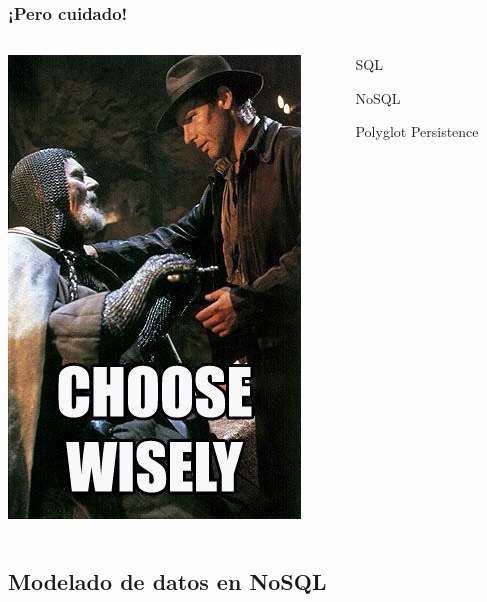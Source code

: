 \documentclass[14pt]{beamer}
\begin{document}
\begin{frame}
  \frametitle{¡Pero cuidado!}
\begin{columns}
\begin{column}{.5\textwidth}
  \includegraphics[height=.7\textheight]{img/chose-wisely}
\end{column}
\begin{column}{.5\textwidth}
\begin{alertblock}{SQL}
\end{alertblock}
\begin{alertblock}{NoSQL}
\end{alertblock}
\begin{alertblock}{Polyglot Persistence}
\end{alertblock}
\end{column}
\end{columns}
\end{frame}



\subsection{Modelado de datos en NoSQL}
\end{document}
